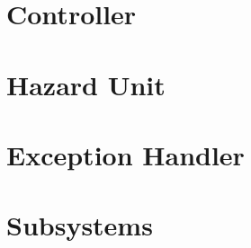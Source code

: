 \documentclass[12pt]{article}
\begin{document}
\section{Controller}


\section{Hazard Unit}


\section{Exception Handler}



\section{Subsystems}

\pagebreak


\pagebreak


\pagebreak
\end{document}

